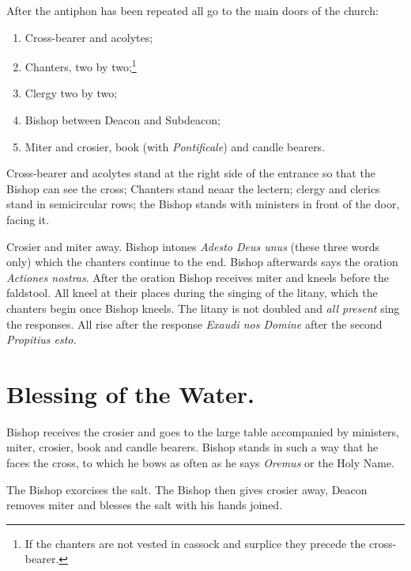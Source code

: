 \documentclass[letterpaper]{report}
\begin{document}
{\rubric After the antiphon has been repeated all go to the main doors of the
church:

\begin{enumerate}

    \item Cross-bearer and acolytes;

    \item Chanters, two by two;\footnote{If the chanters are not vested in
        cassock and surplice they precede the cross-bearer.}

    \item Clergy two by two;

    \item Bishop between Deacon and Subdeacon;

    \item Miter and crosier, book (with \textit{Pontificale}) and candle
        bearers.

\end{enumerate}

Cross-bearer and acolytes stand at the right side of the entrance so that the
Bishop can see the cross; Chanters stand neaar the lectern; clergy and clerics
stand in semicircular rows; the Bishop stands with ministers in front of the
door, facing it.

\rubric Crosier and miter away. Bishop intones \textit{Adesto Deus unus} (these
three words only) which the chanters continue to the end. Bishop afterwards
says the oration \textit{Actiones nostras}. After the oration Bishop receives
miter and kneels before the faldstool. All kneel at their places during the
singing of the litany, which the chanters begin once Bishop kneels. The litany
is not doubled and \textit{all present} sing the responses. All rise after the
response \textit{Exaudi nos Domine} after the second \textit{Propitius esto.}

\section{Blessing of the Water.}

\rubric Bishop receives the crosier and goes to the large table accompanied by
ministers, miter, crosier, book and candle bearers. Bishop stands in such a way
that he faces the cross, to which he bows as often as he says \textit{Oremus}
or the Holy Name.

\rubric The Bishop exorcises the salt. The Bishop then gives crosier away,
Deacon removes miter and blesses the salt with his hands joined.

}
\end{document}
